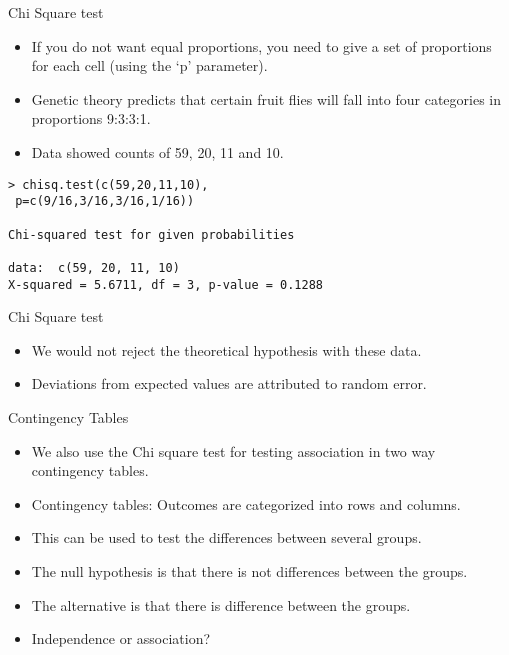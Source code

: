 \documentclass[pdf,default,slideColor,colorBG]{prosper}
\begin{document}
\begin{slide}{Chi Square test}
\begin{itemize}
\item If you do not want equal proportions, you need to give a set of
proportions for each cell (using the `p' parameter).
\item Genetic theory predicts that certain fruit flies
will fall into four categories in proportions 9:3:3:1.
\item Data showed counts of 59, 20, 11 and 10.
\end{itemize}
\begin{verbatim}
> chisq.test(c(59,20,11,10),
 p=c(9/16,3/16,3/16,1/16))

Chi-squared test for given probabilities

data:  c(59, 20, 11, 10)
X-squared = 5.6711, df = 3, p-value = 0.1288
\end{verbatim}
\end{slide}
\begin{slide}{Chi Square test}
\begin{itemize}
\item We would not reject the theoretical hypothesis with these data.
\item Deviations from expected values are attributed to random error.
\end{itemize}
\end{slide}

\begin{slide}{Contingency Tables}

\begin{itemize}
\item We also use the Chi square test for testing association in two way
contingency tables.
\item Contingency tables: Outcomes are categorized into rows and columns.
\item This can be used to test the differences between several groups.
\item The null hypothesis is that there is not differences between the groups.
\item The alternative is that there is difference between the groups.
\item Independence or association?
\end{itemize}

\end{slide}
\end{document}
